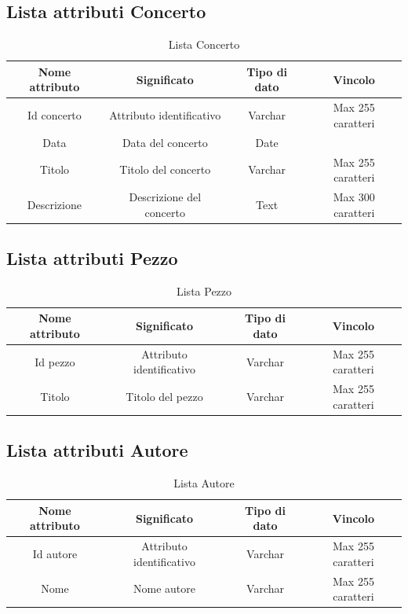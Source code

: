 \documentclass[12pt]{article}
\begin{document}
\subsection*{Lista attributi Concerto}
\begin{table}[h!]
    \centering
    \begin{tabular}{|c|c|c|c|}
        \hline
         Nome attributo & Significato & Tipo di dato & Vincolo  \\
        \hline
        Id concerto & Attributo identificativo & Varchar & Max 255 caratteri  \\
        \hline
        Data & Data del concerto & Date & \\
        \hline 
        Titolo & Titolo del concerto & Varchar & Max 255 caratteri \\ 
        \hline
        Descrizione & Descrizione del concerto & Text & Max 300 caratteri \\
        \hline
    \end{tabular}
    \caption{Lista Concerto}
    \label{tab: tabella entità concerto}
\end{table}


\subsection*{Lista attributi Pezzo}
\begin{table}[h!]
    \centering
    \begin{tabular}{|c|c|c|c|}
        \hline
        Nome attributo & Significato & Tipo di dato & Vincolo  \\
        \hline 
        Id pezzo & Attributo identificativo & Varchar & Max 255 caratteri \\
        \hline
        Titolo & Titolo del pezzo & Varchar & Max 255 caratteri \\
        \hline
    \end{tabular}
    \caption{Lista Pezzo}
    \label{tab: tabella entità pezzo}
\end{table}


\subsection*{Lista attributi Autore}
\begin{table}[h!]
    \centering
    \begin{tabular}{|c|c|c|c|}
        \hline
        Nome attributo & Significato & Tipo di dato & Vincolo \\
        \hline 
        Id autore & Attributo identificativo & Varchar & Max 255 caratteri \\
        \hline
        Nome & Nome autore & Varchar & Max 255 caratteri \\ 
        \hline
    \end{tabular}
    \caption{Lista Autore}
    \label{tab: tabella entità autore}
\end{table}
\end{document}

